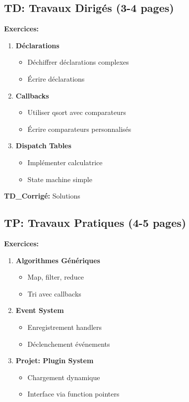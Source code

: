 \documentclass[10pt,a4paper]{article}
\begin{document}
\subsection*{TD: Travaux Dirigés (3-4 pages)}

\textbf{Exercices:}
\begin{enumerate}
\item \textbf{Déclarations}
   \begin{itemize}
   \item Déchiffrer déclarations complexes
   \item Écrire déclarations
   \end{itemize}

\item \textbf{Callbacks}
   \begin{itemize}
   \item Utiliser qsort avec comparateurs
   \item Écrire comparateurs personnalisés
   \end{itemize}

\item \textbf{Dispatch Tables}
   \begin{itemize}
   \item Implémenter calculatrice
   \item State machine simple
   \end{itemize}
\end{enumerate}

\textbf{TD\_Corrigé:} Solutions

\subsection*{TP: Travaux Pratiques (4-5 pages)}

\textbf{Exercices:}
\begin{enumerate}
\item \textbf{Algorithmes Génériques}
   \begin{itemize}
   \item Map, filter, reduce
   \item Tri avec callbacks
   \end{itemize}

\item \textbf{Event System}
   \begin{itemize}
   \item Enregistrement handlers
   \item Déclenchement événements
   \end{itemize}

\item \textbf{Projet: Plugin System}
   \begin{itemize}
   \item Chargement dynamique
   \item Interface via function pointers
   \end{itemize}
\end{enumerate}
\end{document}
